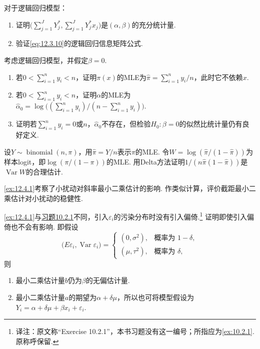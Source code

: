 \begin{exercise}\label{exercise:12.19}
对于逻辑回归模型：
\begin{enumerate}[label=(\alph*)]
\item\label{item:12.19.a} 证明$\bigl(\sum_{j=1}^JY_j^*,\sum_{j=1}^JY_j^*x_j\bigr)$是$(\alpha,\beta)$的充分统计量.
\item\label{item:12.19.b} 验证\eqref{eq:12.3.10}的逻辑回归信息矩阵公式.
\end{enumerate}
\end{exercise}

\begin{exercise}\label{exercise:12.20}
考虑逻辑回归模型，并假定$\beta=0$.
\begin{enumerate}[label=(\alph*)]
\item\label{item:12.20.a} 若$0<\sum_{i=1}^ny_i<n$，证明$\pi(x)$的MLE为$\hat\pi=\sum_{i=1}^ny_i/n$，此时它不依赖$x$.
\item\label{item:12.20.b} 若$0<\sum_{i=1}^ny_i<n$，证明$\alpha$的MLE为$\hat\alpha_0=\log\bigl((\sum_{i=1}^ny_i)/(n-\sum_{i=1}^ny_i)\bigr)$.
\item\label{item:12.20.c} 证明若$\sum_{i=1}^ny_i=0$或$n$，$\hat\alpha_0$不存在，但检验$H_0:\beta=0$的似然比统计量仍有良好定义.
\end{enumerate}
\end{exercise}

\begin{exercise}\label{exercise:12.21}
设$Y\sim\operatorname{binomial}(n,\pi)$，用$\hat\pi=Y/n$表示$\pi$的MLE. 令$W=\log(\hat\pi/(1-\hat\pi))$为样本logit，即$\log(\pi/(1-\pi))$的MLE. 用Delta方法证明$1/(n\hat\pi(1-\hat\pi))$是$\operatorname{Var}W$的合理估计.
\end{exercise}

\begin{exercise}\label{exercise:12.22}
\autoref{ex:12.4.1}考察了小扰动对斜率最小二乘估计的影响. 作类似计算，评价截距最小二乘估计对小扰动的稳健性.
\end{exercise}

\begin{exercise}\label{exercise:12.23}
\autoref{ex:12.4.1}与\hyperref[ex:10.2.1]{习题10.2.1}不同，引入$\varepsilon_i$的污染分布时没有引入偏倚.\footnote{译注：原文称“Exercise 10.2.1”，本书习题没有这一编号；所指应为\autoref{ex:10.2.1}. 原称呼保留.} 证明即使引入偏倚也不会有影响. 即假设
$$\bigl(E\varepsilon_i,\operatorname{Var}\varepsilon_i\bigr)=
\begin{cases}(0,\sigma^2),&\text{概率为 }1-\delta,\\(\mu,\tau^2),&\text{概率为 }\delta,
\end{cases}$$
则
\begin{enumerate}[label=(\alph*)]
\item\label{item:12.23.a} 最小二乘估计量$b$仍为$\beta$的无偏估计量.
\item\label{item:12.23.b} 最小二乘估计量$a$的期望为$\alpha+\delta\mu$，所以也可将模型假设为$Y_i=\alpha+\delta\mu+\beta x_i+\varepsilon_i$.
\end{enumerate}
\end{exercise}

